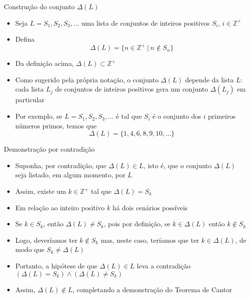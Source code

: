 \begin{frame}[fragile]{Construção do conjunto $\Delta(L)$}

    \begin{itemize}
        \item Seja $L = S_1, S_2, S_3, \ldots$ uma lista de conjuntos de inteiros positivos $S_i$,
            $i\in \mathbb{Z}^+$

        \item Defina
        \[
            \Delta(L) = \lbrace n\in\mathbb{Z}^+\ |\ n \not\in S_n\rbrace
        \]

        \item Da definição acima, $\Delta(L)\subset \mathbb{Z}^+$

        \item Como sugerido pela própria notação, o conjunto $\Delta(L)$ depende da lista $L$:
            cada lista $L_j$ de conjuntos de inteiros positivos gera um conjunto $\Delta(L_j)$
            em particular

        \item Por exemplo, se $L = S_1, S_2, S_3, \ldots$ é tal que $S_i$ é o conjunto dos
            $i$ primeiros números primos, temos que
        \[
            \Delta(L) = \lbrace 1, 4, 6, 8, 9, 10, \ldots \rbrace
        \]
    \end{itemize}

\end{frame}

\begin{frame}[fragile]{Demonstração por contradição}

    \begin{itemize}
        \item Suponha, por contradição, que $\Delta(L)\in L$, isto é, que o conjunto $\Delta(L)$
            seja listado, em algum momento, por $L$

        \item Assim, existe um $k\in\mathbb{Z}^+$ tal que $\Delta(L) = S_k$

        \item Em relação ao inteiro positivo $k$ há dois cenários possíveis

        \item Se $k\in S_k$, então $\Delta(L)\neq S_k$, pois por definição, se $k\in\Delta(L)$ então
            $k\not\in S_k$

        \item Logo, deveríamos ter $k\not\in S_k$ mas, neste caso, teríamos que ter $k\in\Delta(L)$,
            de modo que $S_k\neq \Delta(L)$

        \item Portanto, a hipótese de que $\Delta(L)\in L$ leva a contradição
            $(\Delta(L)=S_k) \land (\Delta(L)\neq S_k)$

        \item Assim, $\Delta(L)\not\in L$, completando a demonstração do Teorema de Cantor
    \end{itemize}

\end{frame}

